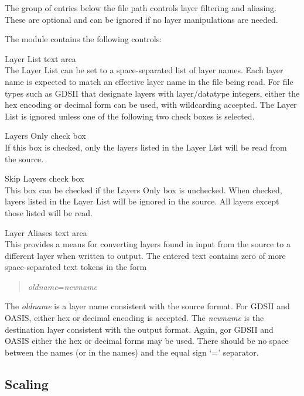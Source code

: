The group of entries below the file path controls layer filtering and
aliasing.  These are optional and can be ignored if no layer
manipulations are needed.

The module contains the following controls:

\begin{description}
\item{{\cb Layer List} text area}\\
The {\cb Layer List} can be set to a space-separated list of layer
names.  Each layer name is expected to match an effective layer name
in the file being read.  For file types such as GDSII that designate
layers with layer/datatype integers, either the hex encoding or
decimal form can be used, with wildcarding accepted.  The {\cb Layer
List} is ignored unless one of the following two check boxes is
selected.

\item{{\cb Layers Only} check box}\\
If this box is checked, only the layers listed in the {\cb Layer
List} will be read from the source.

\item{{\cb Skip Layers} check box}\\
This box can be checked if the {\cb Layers Only} box is unchecked. 
When checked, layers listed in the {\cb Layer List} will be ignored in
the source.  All layers except those listed will be read.

\item{{\cb Layer Aliases} text area}\\
This provides a means for converting layers found in input from the
source to a different layer when written to output.  The entered text
contains zero of more space-separated text tokens in the form
\begin{quote}
{\it oldname\/}={\it newname}
\end{quote}
The {\it oldname} is a layer name consistent with the source format. 
For GDSII and OASIS, either hex or decimal encoding is accepted.  The
{\it newname} is the destination layer consistent with the output
format.  Again, gor GDSII and OASIS either the hex or decimal forms
may be used.  There should be no space between the names (or in the
names) and the equal sign `=' separator.
\end{description}

\subsection{Scaling}

